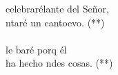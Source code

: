 \begin{cancion}[Yo celebraré][]%
	celebrarélante del Señor,\\
	ntaré un cantoevo. (**)\\
\jump\\
	le baré porq él \\
	ha hecho ndes cosas. (**)\\
\end{cancion}%
